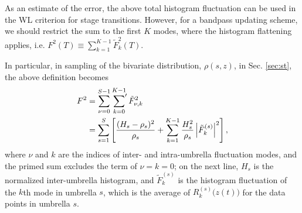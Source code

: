 \documentclass[preprint, superscriptaddress, floatfix]{revtex4-1}
\begin{document}

As an estimate of the error,
the above total histogram fluctuation
can be used in the WL criterion for stage transitions.
%
However, for a bandpass updating scheme,
we should restrict the sum to the first $K$ modes,
where the histogram flattening applies, i.e.
$F^2(T) \equiv \sum_{k = 1}^{K-1} \tilde F_k^2(T)$.
%

In particular,
in sampling of the bivariate distribution,
$\rho(s, z)$, in Sec. \ref{sec:st},
the above definition becomes
\begin{align}
  F^2
  &=
  \sum_{\nu = 0}^{S - 1}
  \sideset{}{'}\sum_{k = 0}^{K - 1}
  \tilde F_{\nu, k}^2
  \notag \\
  &=
  \sum_{s=1}^S
  \left[
  \frac{ (H_s - \rho_s)^2 } { \rho_s }
  +
  \sum_{k = 1}^{K - 1}
  \frac{ H_s^2 } { \rho_s }
  \left|{\tilde F}_k^{(s)} \right|^2
  \right]
  ,
  \label{eq:F2st}
\end{align}
where $\nu$ and $k$ are the indices of
inter- and intra-umbrella fluctuation modes,
and the primed sum excludes
the term of $\nu = k = 0$;
on the next line,
$H_s$ is the normalized inter-umbrella histogram,
and
$\tilde F_k^{(s)}$
is the histogram fluctuation of the $k$th mode in umbrella $s$,
which is the average of $R_k^{(s)}\bigl( z(t) \bigr)$
for the data points in umbrella $s$.
\end{document}
